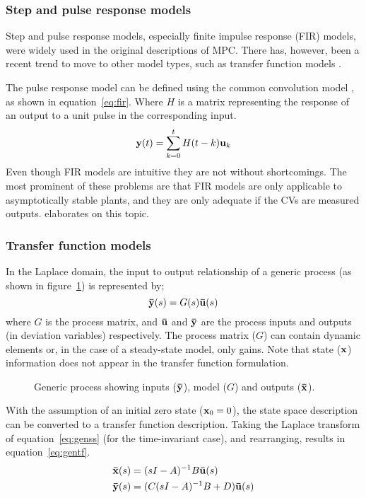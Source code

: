 \subsubsection{Step and pulse response models}
Step and pulse response models, especially finite impulse response (FIR) models, were widely used in the original descriptions of MPC.
There has, however, been a recent trend to move to other model types, such as transfer function models .

The pulse response model can be defined using the common convolution model \citep[284]{luyben}, as shown in equation~\ref{eq:fir}.
Where $H$ is a matrix representing the response of an output to a unit pulse in the corresponding input.
\begin{equation}
  \label{eq:fir}
  {\bf {y}}(t) = \sum^t_{k=0}H(t-k){\bf {u}}_k
\end{equation} 
Even though FIR models are intuitive they are not without shortcomings.
The most prominent of these problems are that FIR models are only applicable to asymptotically stable plants, and they are only adequate if the CVs are measured outputs.
\citet[109]{maciejowskimpc} elaborates on this topic.

\subsubsection{Transfer function models}
In the Laplace domain, the input to output relationship of a generic process (as shown in figure~\ref{fig:genmodel}) is represented by;
\begin{equation*}
  {\bf {\bar y}}(s)=G(s){\bf {\bar u}}(s)
\end{equation*}
where $G$ is the process matrix, and ${\bf {\bar u}}$ and ${\bf {\bar y}}$ are the process inputs and outputs (in deviation variables) respectively.
The process matrix ($G$) can contain dynamic elements or, in the case of a steady-state model, only gains.
Note that state (${\bf {x}}$) information does not appear in the transfer function formulation.
\begin{figure}[htbp]
  \centering
  \scalebox{1}{}
  \caption[Generic input to output model]{Generic process showing inputs (${\bf {\bar y}}$), model ($G$) and outputs (${\bf {\bar x}}$).}
  \label{fig:genmodel}
\end{figure}

With the assumption of an initial zero state (${\bf {x}}_0=0$), the state space description can be converted to a transfer function description.
Taking the Laplace transform of equation~\ref{eq:genss} (for the time-invariant case), and rearranging, results in equation~\ref{eq:gentf}.
\begin{align}
  \label{eq:gentf}
    {\bf {\bar x}}(s) &= (sI-A)^{-1}B{\bf {\bar u}}(s) \\
    {\bf {\bar y}}(s) &= (C(sI-A)^{-1}B+D){\bf {\bar u}}(s) \notag
\end{align} 
